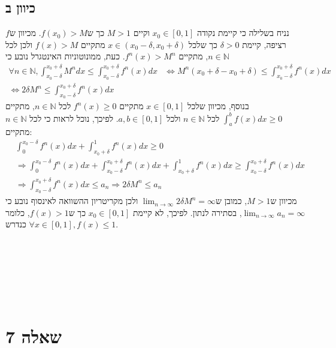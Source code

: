 \documentclass[11pt, oneside]{article}
\newcommand{\qed}{\R{$\blacksquare$}}
\newcommand{\br}{\\\\\\\\\\\\\\}
\newcommand{\logr}[1]{\underset{\text{#1}}{\Longrightarrow}}
\newcommand{\mN}{\mathbb{N}}
\newcommand{\defi}[3]{\int_{#1}^{#2} #3}
\begin{document}
\subsection*{כיוון ב}
נניח בשלילה כי קיימת נקודה $x_{0} \in [0, 1]$ וקיים $M > 1$ כך ש$f(x_{0}) > M$. מכיוון ש$f$ רציפה, קיימת $\delta > 0$ כך שלכל $x \in (x_{0} - \delta, x_{0} + \delta)$ מתקיים $f(x) > M$ ולכן לכל $n \in \mN$, מתקיים $f^{n}(x) > M^{n}$. כעת, ממונוטוניות האינטגרל נובע כי 
\begin{eqnarray*}
\forall n \in \mN, \defi{x_{0} - \delta}{x_{0} + \delta}{M^{n}dx} \le \defi{x_{0} - \delta}{x_{0} + \delta}{f^{n}(x)dx}
& \iff M^{n}(x_{0} + \delta - x_{0} + \delta) \le \defi{x_{0} - \delta}{x_{0} + \delta}{f^{n}(x)dx}\\
\iff 2\delta M^{n} \le \defi{x_{0} - \delta}{x_{0} + \delta}{f^{n}(x)dx}
\end{eqnarray*}
בנוסף, מכיוון שלכל $x \in [0, 1]$ מתקיים $f^{n}(x) \ge 0$ לכל $n \in \mN$, מתקיים $\defi{a}{b}{f(x)dx} \ge 0$ לכל $n \in \mN$ ולכל $a, b \in [0, 1]$. לפיכך, נוכל לראות כי לכל $n \in \mN$ מתקיים:
\begin{align*}
& \defi{0}{x_{0} - \delta}{f^{n}(x)dx} + \defi{x_{0} + \delta}{1}{f^{n}(x)dx} \ge 0\\
& \logr{} \defi{0}{x_{0} - \delta}{f^{n}(x)dx} + \defi{x_{0} - \delta}{x_{0} + \delta}{f^{n}(x)dx} + \defi{x_{0} + \delta}{1}{f^{n}(x)dx} \ge \defi{x_{0} - \delta}{x_{0} + \delta}{f^{n}(x)dx}\\
& \logr{} \defi{x_{0} - \delta}{x_{0} + \delta}{f^{n}(x)dx} \le a_{n}
\logr{} 2\delta M^{n} \le a_{n}
\end{align*}
מכיוון ש$M > 1$, כמובן ש$\lim_{n \to \infty} 2\delta M^{n} = \infty$ ולכן מקריטריון ההשוואה לאינסוף נובע כי $\lim_{n \to \infty} a_{n} = \infty$, בסתירה לנתון. לפיכך, לא קיימת $x_{0} \in [0, 1]$ כך ש$f(x) > 1$, כלומר $\forall x \in [0, 1], f(x) \le 1$ כנדרש.
\br\qed
\clearpage

\section*{שאלה 7}
\end{document}
